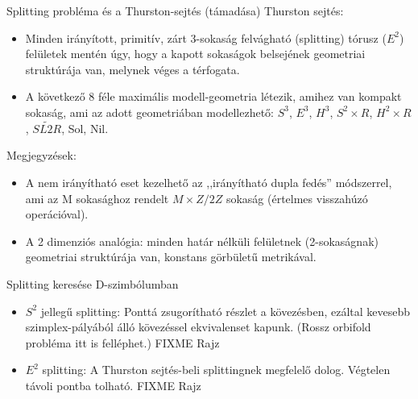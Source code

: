 \begin{frame}
  Splitting probléma és a Thurston-sejtés (támadása)
  Thurston sejtés:
  \begin{itemize}
    \item Minden irányított, primitív, zárt 3-sokaság felvágható (splitting)
      tórusz ($E^2$) felületek mentén úgy, hogy a kapott sokaságok belsejének
      geometriai struktúrája van, melynek véges a térfogata.
    \item A következő 8 féle maximális modell-geometria létezik, amihez van
      kompakt sokaság, ami az adott geometriában modellezhető: $S^3$, $E^3$,
      $H^3$, $S^2\times R$, $H^2\times R$, $\widetilde{SL2R}$, Sol,
      Nil.
  \end{itemize}
  Megjegyzések:
  \begin{itemize}
    \item A nem irányítható eset kezelhető az ,,irányítható dupla fedés''
      módszerrel, ami az M sokasághoz rendelt $M\times Z/2Z$ sokaság
      (értelmes visszahúzó operációval). 
    \item A 2 dimenziós analógia: minden határ nélküli felületnek (2-sokaságnak)
      geometriai struktúrája van, konstans görbületű metrikával.
  \end{itemize}
\end{frame}

\begin{frame}
  Splitting keresése D-szimbólumban
  \begin{itemize}
    \item $S^2$ jellegű splitting: Ponttá zsugorítható részlet a kövezésben,
      ezáltal  kevesebb
      szimplex-pályából álló kövezéssel ekvivalenset kapunk. (Rossz orbifold
      probléma itt is felléphet.)
      FIXME Rajz
    \item $E^2$ splitting: A Thurston sejtés-beli splittingnek megfelelő dolog.
      Végtelen távoli pontba tolható.
      FIXME Rajz
  \end{itemize}
\end{frame}

